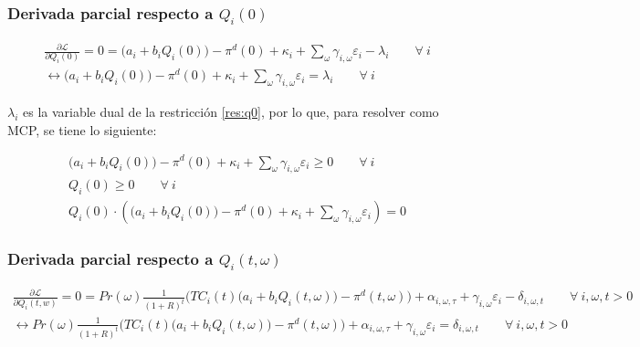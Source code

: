 \subsubsection{Derivada parcial respecto a $Q_i(0)$}
\begin{footnotesize}
\begin{align}
    \frac{\partial \mathcal{L} }{\partial Q_i(0)}= 0 =  \big(a_{i}+b_i Q_{i}(0)\big)-\pi^d(0) + \kappa_i  + \sum_{\omega} \gamma_{i,\omega}\varepsilon_i-\lambda_i \qquad \forall \  i  \\
     \leftrightarrow \big(a_{i}+b_i Q_{i}(0)\big)-\pi^d(0) + \kappa_i  + \sum_{\omega} \gamma_{i,\omega}\varepsilon_i = \lambda_i \qquad \forall \  i
\end{align}

\end{footnotesize}

$\lambda_i$ es la variable dual de la restricción \ref{res:q0}, por lo que, para resolver como MCP, se tiene lo siguiente:

\begin{footnotesize}
\begin{align}
    \big(a_{i}+b_i Q_{i}(0)\big)-\pi^d(0) + \kappa_i  + \sum_{\omega} \gamma_{i,\omega}\varepsilon_i \geq 0 \qquad \forall \  i  \\
    Q_i(0) \geq 0 \qquad \forall \  i  \\
    Q_i(0)\cdot ( \big(a_{i}+b_i Q_{i}(0)\big)-\pi^d(0) + \kappa_i  + \sum_{\omega} \gamma_{i,\omega}\varepsilon_i)=0 
\end{align}

\end{footnotesize}



\subsubsection{Derivada parcial respecto a $Q_i(t,\omega)$}
\begin{footnotesize}
\begin{align}
   \frac{\partial \mathcal{L} }{\partial Q_i(t,w)}= 
   0= Pr(\omega)  \frac{1}{(1+R)^t} \bigg( TC_i(t) \big(a_{i}+b_i Q_i(t,\omega)\big ) -\pi^d(t,\omega) \bigg) + \alpha_{i,\omega,\tau} + \gamma_{i,\omega} \varepsilon_{i} -\delta_{i,\omega,t} \qquad  \forall \ i, \omega, t > 0\\
   \leftrightarrow Pr(\omega)  \frac{1}{(1+R)^t} \bigg( TC_i(t) \big(a_{i}+b_i Q_i(t,\omega)\big ) -\pi^d(t,\omega) \bigg) + \alpha_{i,\omega,\tau} + \gamma_{i,\omega} \varepsilon_{i}= \delta_{i,\omega,t} \qquad \forall \ i, \omega, t > 0
\end{align}
\end{footnotesize}

